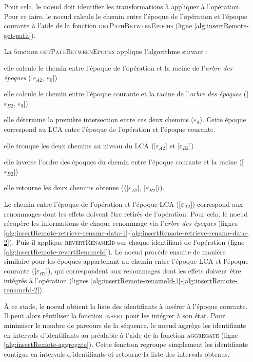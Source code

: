 \documentclass[12pt]{thesul}
\newcommand{\epoch}[1]{$\varepsilon_{#1}$}
\begin{document}
Pour cela, le noeud doit identifier les transformations à appliquer à l'opération.
Pour ce faire, le noeud calcule le chemin entre l'époque de l'opération et l'époque courante à l'aide de la fonction \textsc{getPathBetweenEpochs} (ligne \ref{alg:insertRemote-get-path}).

La fonction \textsc{getPathBetweenEpochs} applique l'algorithme suivant :
\begin{enumerate*}[label=(\roman*)]
  \item elle calcule le chemin entre l'époque de l'opération et la racine de l'\emph{arbre des époques} ([\epoch{A2}, \epoch{0}])
  \item elle calcule le chemin entre l'époque courante et la racine de l'\emph{arbre des époques} ([\epoch{B2}, \epoch{0}])
  \item elle détermine la première intersection entre ces deux chemins (\epoch{0}).
    Cette époque correspond au \acf{LCA} entre l'époque de l'opération et l'époque courante.
  \item elle tronque les deux chemins au niveau du \ac{LCA} ([\epoch{A2}] et [\epoch{B2}])
  \item elle inverse l'ordre des époques du chemin entre l'époque courante et la racine ([\epoch{B2}])
  \item elle retourne les deux chemins obtenus ($\langle$[\epoch{A2}], [\epoch{B2}]$\rangle$).
\end{enumerate*}

Le chemin entre l'époque de l'opération et l'époque \ac{LCA} ([\epoch{A2}]) correspond aux renommages dont les effets doivent être retirés de l'opération.
Pour cela, le noeud récupère les informations de chaque renommage via l'\emph{arbre des époques} (lignes \ref{alg:insertRemote-retrieve-rename-data-1}-\ref{alg:insertRemote-retrieve-rename-data-2}).
Puis il applique \textsc{revertRenameId} sur chaque identifiant de l'opération (ligne \ref{alg:insertRemote-revertRenameId}).
Le noeud procède ensuite de manière similaire pour les époques appartenant au chemin entre l'époque \ac{LCA} et l'époque courante ([\epoch{B2}]), qui correspondent aux renommages dont les effets doivent être intégrés à l'opération (lignes \ref{alg:insertRemote-renameId-1}-\ref{alg:insertRemote-renameId-2}).

À ce stade, le noeud obtient la liste des identifiants à insérer à l'époque courante.
Il peut alors réutiliser la fonction \textsc{insert} pour les intégrer à son état.
Pour minimiser le nombre de parcours de la séquence, le noeud aggrège les identifiants en intervals d'identifiants au préalable à l'aide de la fonction \textsc{aggregate} (ligne \ref{alg:insertRemote-aggregate}).
Cette fonction regroupe simplement les identifiants contigus en intervals d'identifiants et retourne la liste des intervals obtenus.
\end{document}
